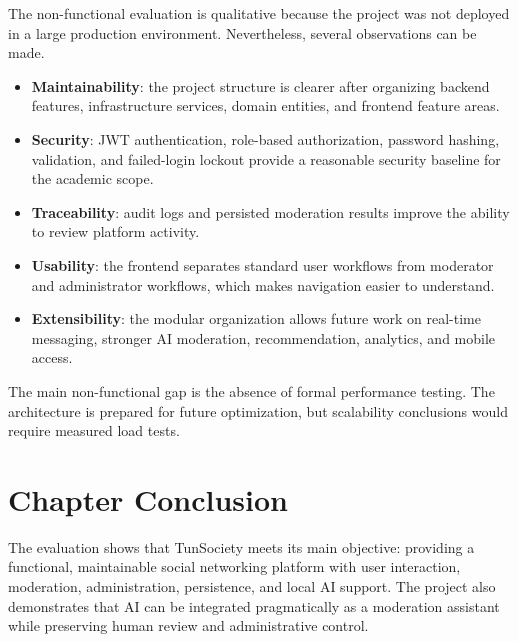 The non-functional evaluation is qualitative because the project was not deployed in a large production environment. Nevertheless, several observations can be made.

\begin{itemize}
    \item \textbf{Maintainability}: the project structure is clearer after organizing backend features, infrastructure services, domain entities, and frontend feature areas.
    \item \textbf{Security}: JWT authentication, role-based authorization, password hashing, validation, and failed-login lockout provide a reasonable security baseline for the academic scope.
    \item \textbf{Traceability}: audit logs and persisted moderation results improve the ability to review platform activity.
    \item \textbf{Usability}: the frontend separates standard user workflows from moderator and administrator workflows, which makes navigation easier to understand.
    \item \textbf{Extensibility}: the modular organization allows future work on real-time messaging, stronger AI moderation, recommendation, analytics, and mobile access.
\end{itemize}

The main non-functional gap is the absence of formal performance testing. The architecture is prepared for future optimization, but scalability conclusions would require measured load tests.

\section{Chapter Conclusion}

The evaluation shows that TunSociety meets its main objective: providing a functional, maintainable social networking platform with user interaction, moderation, administration, persistence, and local AI support. The project also demonstrates that AI can be integrated pragmatically as a moderation assistant while preserving human review and administrative control.
